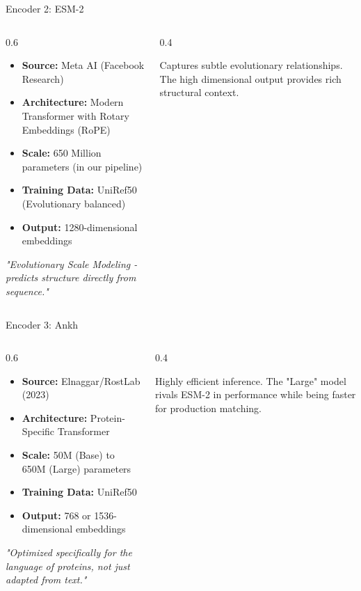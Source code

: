 \documentclass[aspectratio=169]{beamer}
\begin{document}
\begin{frame}{Encoder 2: ESM-2}
  \begin{columns}
    \begin{column}{0.6\textwidth}
      \begin{itemize}
        \item \textbf{Source:} Meta AI (Facebook Research)
        \item \textbf{Architecture:} Modern Transformer with Rotary Embeddings (RoPE)
        \item \textbf{Scale:} 650 Million parameters (in our pipeline)
        \item \textbf{Training Data:} UniRef50 (Evolutionary balanced)
        \item \textbf{Output:} 1280-dimensional embeddings
      \end{itemize}
      \vspace{0.5cm}
      \textit{"Evolutionary Scale Modeling - predicts structure directly from sequence."}
    \end{column}
    \begin{column}{0.4\textwidth}
      \begin{tcolorbox}[colback=green!5,colframe=green!40,title=Why we use it]
      Captures subtle evolutionary relationships. The high dimensional output provides rich structural context.
      \end{tcolorbox}
    \end{column}
  \end{columns}
\end{frame}

\begin{frame}{Encoder 3: Ankh}
  \begin{columns}
    \begin{column}{0.6\textwidth}
      \begin{itemize}
        \item \textbf{Source:} Elnaggar/RostLab (2023)
        \item \textbf{Architecture:} Protein-Specific Transformer
        \item \textbf{Scale:} 50M (Base) to 650M (Large) parameters
        \item \textbf{Training Data:} UniRef50
        \item \textbf{Output:} 768 or 1536-dimensional embeddings
      \end{itemize}
      \vspace{0.5cm}
      \textit{"Optimized specifically for the language of proteins, not just adapted from text."}
    \end{column}
    \begin{column}{0.4\textwidth}
      \begin{tcolorbox}[colback=orange!5,colframe=orange!40,title=Why we use it]
      Highly efficient inference. The "Large" model rivals ESM-2 in performance while being faster for production matching.
      \end{tcolorbox}
    \end{column}
  \end{columns}
\end{frame}
\end{document}
